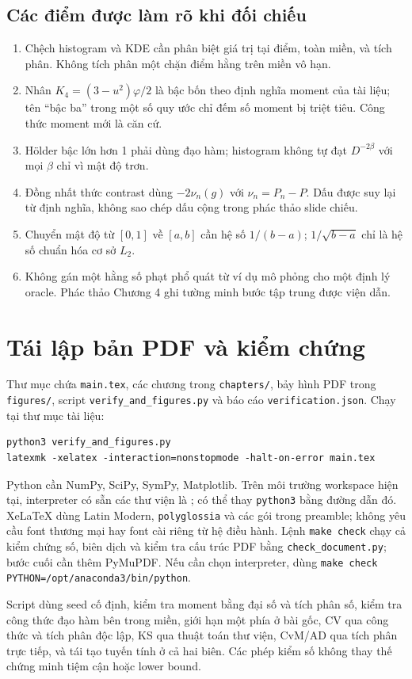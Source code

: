 \subsection{Các điểm được làm rõ khi đối chiếu}
\begin{enumerate}
\item Chệch histogram và KDE cần phân biệt giá trị tại điểm, toàn miền,
và tích phân. Không tích phân một chặn điểm hằng trên miền vô hạn.
\item Nhân $K_4=(3-u^2)\varphi/2$ là bậc bốn theo định nghĩa moment
của tài liệu; tên ``bậc ba'' trong một số quy ước chỉ đếm số moment
bị triệt tiêu. Công thức moment mới là căn cứ.
\item Hölder bậc lớn hơn 1 phải dùng đạo hàm; histogram không tự đạt
$D^{-2\beta}$ với mọi $\beta$ chỉ vì mật độ trơn.
\item Đồng nhất thức contrast dùng $-2\nu_n(g)$ với
$\nu_n=P_n-P$. Dấu được suy lại từ định nghĩa, không sao chép dấu cộng
trong phác thảo slide chiếu.
\item Chuyển mật độ từ $[0,1]$ về $[a,b]$ cần hệ số $1/(b-a)$;
$1/\sqrt{b-a}$ chỉ là hệ số chuẩn hóa cơ sở $L_2$.
\item Không gán một hằng số phạt phổ quát từ ví dụ mô phỏng cho một
định lý oracle. Phác thảo Chương 4 ghi tường minh bước tập trung được
viện dẫn.
\end{enumerate}

\section{Tái lập bản PDF và kiểm chứng}
Thư mục chứa \texttt{main.tex}, các chương trong \texttt{chapters/},
bảy hình PDF trong \texttt{figures/}, script \texttt{verify\_and\_figures.py}
và báo cáo \texttt{verification.json}.
Chạy tại thư mục tài liệu:
\begin{verbatim}
python3 verify_and_figures.py
latexmk -xelatex -interaction=nonstopmode -halt-on-error main.tex
\end{verbatim}
Python cần NumPy, SciPy, SymPy, Matplotlib. Trên môi trường workspace
hiện tại, interpreter có sẵn các thư viện là
; có thể thay \texttt{python3} bằng đường
dẫn đó. XeLaTeX dùng Latin Modern, \texttt{polyglossia} và các gói trong
preamble; không yêu cầu font thương mại hay font cài riêng từ hệ điều hành.
Lệnh \texttt{make check} chạy cả kiểm chứng số, biên dịch và kiểm tra cấu
trúc PDF bằng \texttt{check\_document.py}; bước cuối cần thêm PyMuPDF.
Nếu cần chọn interpreter, dùng
\texttt{make check PYTHON=/opt/anaconda3/bin/python}.

Script dùng seed cố định, kiểm tra moment bằng đại số và tích phân số,
kiểm tra công thức đạo hàm bên trong miền, giới hạn một phía ở bài gốc,
CV qua công thức và tích phân độc lập, KS qua thuật toán thư viện,
CvM/AD qua tích phân trực tiếp, và tái tạo tuyến tính ở cả hai biên.
Các phép kiểm số không thay thế chứng minh tiệm cận hoặc lower bound.
